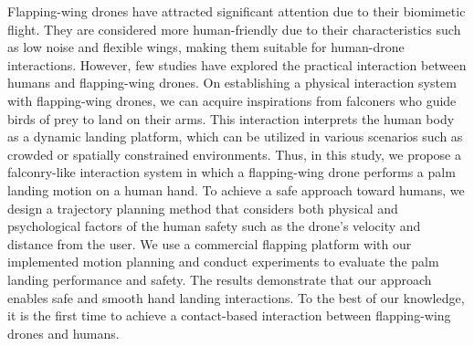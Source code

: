Flapping-wing drones have attracted significant attention due to their biomimetic flight.
They are considered more human-friendly due to their characteristics such as low noise and flexible wings, 
making them suitable for human-drone interactions. 
However, few studies have explored the practical interaction between humans and flapping-wing drones. 
On establishing a physical interaction system with flapping-wing drones,
we can acquire inspirations from falconers who guide birds of prey to land on their arms.
This interaction interprets the human body as a dynamic landing platform, which can be utilized in various scenarios such as crowded or spatially constrained environments.
Thus, in this study, we propose a falconry-like interaction system in which a flapping-wing drone performs a palm landing motion on a human hand. 
To achieve a safe approach toward humans, we design a trajectory planning method that considers both physical and psychological factors of the human safety such as the drone's velocity and distance from the user.
We use a commercial flapping platform with our implemented motion planning and conduct experiments to evaluate the palm landing performance and safety.
The results demonstrate that our approach enables safe and smooth hand landing interactions. 
To the best of our knowledge, it is the first time to achieve a contact-based interaction between flapping-wing drones and humans.